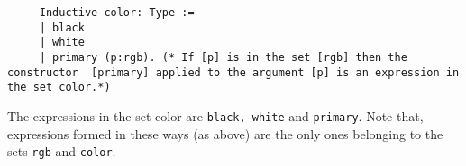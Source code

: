 	 \begin{lstlisting}
	 Inductive color: Type := 
	 | black
	 | white
	 | primary (p:rgb). (* If [p] is in the set [rgb] then the constructor  [primary] applied to the argument [p] is an expression in the set color.*) 
	 \end{lstlisting}
	 
	 The expressions in the set color are \lstinline!black, white! and \lstinline!primary!.
	 Note that, expressions formed in these ways (as above) are the only ones belonging to the sets \lstinline!rgb! and \lstinline!color!.
	 
     
     
     